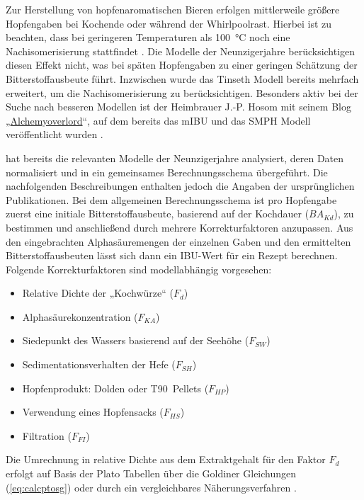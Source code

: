 \documentclass[a4paper,parskip=half]{scrartcl}
\newcommand{\BAKt}{{\mathit{BA}}_{\mathit{Kd}}}
\newcommand{\FKd}{F_{\mathit{d}}}
\newcommand{\FHR}{F_{\mathit{KA}}}
\newcommand{\FSP}{F_{\mathit{SW}}}
\newcommand{\FAH}{F_{\mathit{SH}}}
\newcommand{\FHF}{F_{\mathit{HP}}}
\newcommand{\FHS}{F_{\mathit{HS}}}
\newcommand{\FFil}{F_{\mathit{FI}}}
\begin{document}
Zur Herstellung von hopfenaromatischen Bieren erfolgen mittlerweile größere Hopfengaben bei Kochende oder während der Whirlpoolrast. Hierbei ist zu beachten, dass bei geringeren Temperaturen als 100~°C noch eine Nachisomerisierung stattfindet \parencite{Weiss2019}. Die Modelle der Neunzigerjahre berücksichtigen diesen Effekt nicht, was bei späten Hopfengaben zu einer geringen Schätzung der Bitterstoffausbeute führt. Inzwischen wurde das Tinseth Modell bereits mehrfach erweitert, um die Nachisomerisierung zu berücksichtigen. Besonders aktiv bei der Suche nach besseren Modellen ist der Heimbrauer J.-P. Hosom mit seinem Blog „\href{https://jphosom.github.io/alchemyoverlord}{Alchemyoverlord}“, auf dem bereits das mIBU und das SMPH Modell veröffentlicht wurden \parencites{Hosom2015}{Hosom2021}.

\textcite{Hall1997} hat bereits die relevanten Modelle der Neunzigerjahre analysiert, deren Daten normalisiert und in ein gemeinsames Berechnungsschema übergeführt. Die nachfolgenden Beschreibungen enthalten jedoch die Angaben der ursprünglichen Publikationen. Bei dem allgemeinen Berechnungsschema ist pro Hopfengabe zuerst eine initiale Bitterstoffausbeute, basierend auf der Kochdauer ($\BAKt$), zu bestimmen und anschließend durch mehrere Korrekturfaktoren anzupassen. Aus den eingebrachten Alphasäuremengen der einzelnen Gaben und den ermittelten Bitterstoffausbeuten lässt sich dann ein IBU-Wert für ein Rezept berechnen. Folgende Korrekturfaktoren sind modellabhängig vorgesehen:

\begin{itemize}
\item Relative Dichte der „Kochwürze“ ($\FKd$)
\item Alphasäurekonzentration ($\FHR$)
\item Siedepunkt des Wassers basierend auf der Seehöhe ($\FSP$)
\item Sedimentationsverhalten der Hefe ($\FAH$)
\item Hopfenprodukt: Dolden oder T90~Pellets ($\FHF$)
\item Verwendung eines Hopfensacks ($\FHS$)
\item Filtration ($\FFil$)
\end{itemize}

Die Umrechnung in relative Dichte aus dem Extraktgehalt für den Faktor $\FKd$  erfolgt auf Basis der Plato Tabellen über die Goldiner Gleichungen (\autoref{eq:calcptosg}) oder durch ein vergleichbares Näherungsverfahren \parencite[140\psq]{Spedding2016}.
\end{document}
